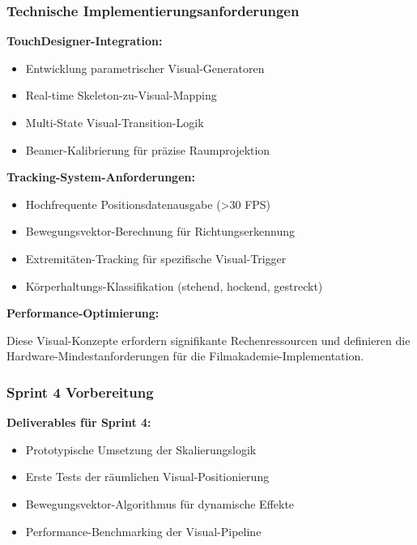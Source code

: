 \subsubsection{Technische Implementierungsanforderungen}

\textbf{TouchDesigner-Integration:}
\begin{itemize}
    \item Entwicklung parametrischer Visual-Generatoren
    \item Real-time Skeleton-zu-Visual-Mapping
    \item Multi-State Visual-Transition-Logik
    \item Beamer-Kalibrierung für präzise Raumprojektion
\end{itemize}

\textbf{Tracking-System-Anforderungen:}
\begin{itemize}
    \item Hochfrequente Positionsdatenausgabe (>30 FPS)
    \item Bewegungsvektor-Berechnung für Richtungserkennung
    \item Extremitäten-Tracking für spezifische Visual-Trigger
    \item Körperhaltungs-Klassifikation (stehend, hockend, gestreckt)
\end{itemize}

\textbf{Performance-Optimierung:}
\raggedright Diese Visual-Konzepte erfordern signifikante Rechenressourcen und definieren die Hardware-Mindestanforderungen für die Filmakademie-Implementation.

\subsubsection{Sprint 4 Vorbereitung}

\textbf{Deliverables für Sprint 4:}
\begin{itemize}
    \item Prototypische Umsetzung der Skalierungslogik
    \item Erste Tests der räumlichen Visual-Positionierung
    \item Bewegungsvektor-Algorithmus für dynamische Effekte
    \item Performance-Benchmarking der Visual-Pipeline
\end{itemize}